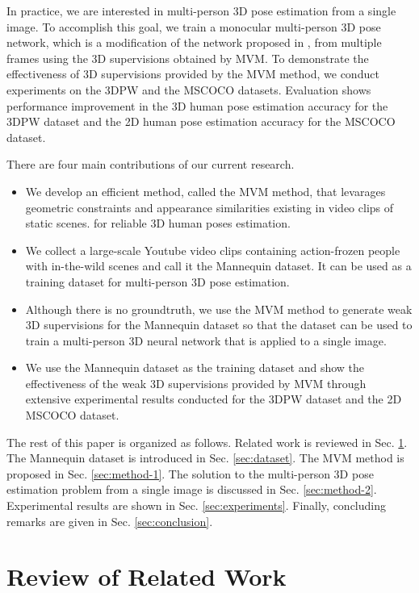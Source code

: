 \documentclass{article}
\begin{document}
In practice, we are interested in multi-person 3D pose estimation
from a single image.  To accomplish this goal, we train a monocular
multi-person 3D pose network, which is a modification of the network
proposed in \cite{kreiss2019pifpaf}, from multiple frames using the 3D
supervisions obtained by MVM.  To demonstrate the effectiveness of 3D
supervisions provided by the MVM method, we conduct experiments on the
3DPW and the MSCOCO datasets. Evaluation shows performance improvement
in the 3D human pose estimation accuracy for the 3DPW dataset and the 2D
human pose estimation accuracy for the MSCOCO dataset. 

There are four main contributions of our current research.
\begin{itemize}
\item We develop an efficient method, called the MVM method, that
levarages geometric constraints and appearance similarities existing in
video clips of static scenes.  for reliable 3D human poses estimation. 
\item We collect a large-scale Youtube video clips containing
action-frozen people with in-the-wild scenes and call it the Mannequin
dataset. It can be used as a training dataset for multi-person 3D
pose estimation. 
\item Although there is no groundtruth, we use the MVM method to generate
weak 3D supervisions for the Mannequin dataset so that the dataset can
be used to train a multi-person 3D neural network that is applied to a
single image. 
\item We use the Mannequin dataset as the training dataset and show the
effectiveness of the weak 3D supervisions provided by MVM through
extensive experimental results conducted for the 3DPW dataset and the 2D
MSCOCO dataset. 
\end{itemize}

The rest of this paper is organized as follows. Related work is reviewed
in Sec. \ref{sec:review}. The Mannequin dataset is introduced in Sec.
\ref{sec:dataset}. The MVM method is proposed in Sec.
\ref{sec:method-1}. The solution to the multi-person 3D pose estimation
problem from a single image is discussed in Sec. \ref{sec:method-2}.
Experimental results are shown in Sec.  \ref{sec:experiments}. Finally,
concluding remarks are given in Sec.  \ref{sec:conclusion}. 

\section{Review of Related Work}\label{sec:review}
\end{document}
